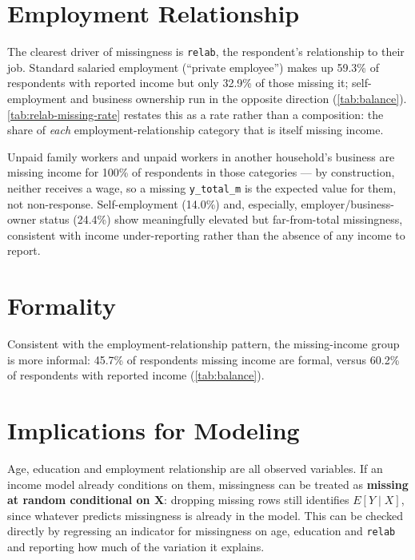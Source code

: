 \documentclass[11pt]{article}
\begin{document}
\section{Employment Relationship}
\label{sec:relab}

The clearest driver of missingness is \texttt{relab}, the respondent's relationship to
their job. Standard salaried employment (``private employee'') makes up 59.3\% of
respondents with reported income but only 32.9\% of those missing it; self-employment and
business ownership run in the opposite direction (\autoref{tab:balance}).
\autoref{tab:relab-missing-rate} restates this as a rate rather than a composition: the
share of \emph{each} employment-relationship category that is itself missing income.



Unpaid family workers and unpaid workers in another household's business are missing
income for 100\% of respondents in those categories --- by construction, neither receives
a wage, so a missing \texttt{y\_total\_m} is the expected value for them, not
non-response. Self-employment (14.0\%) and, especially, employer/business-owner status
(24.4\%) show meaningfully elevated but far-from-total missingness, consistent with
income under-reporting rather than the absence of any income to report.

\section{Formality}

Consistent with the employment-relationship pattern, the missing-income group is more
informal: 45.7\% of respondents missing income are formal, versus 60.2\% of respondents
with reported income (\autoref{tab:balance}).

\section{Implications for Modeling}

Age, education and employment relationship are all observed variables. If an income
model already conditions on them, missingness can be treated as \textbf{missing at
random conditional on X}: dropping missing rows still identifies $E[Y \mid X]$, since
whatever predicts missingness is already in the model. This can be checked directly by
regressing an indicator for missingness on age, education and \texttt{relab} and
reporting how much of the variation it explains.
\end{document}
